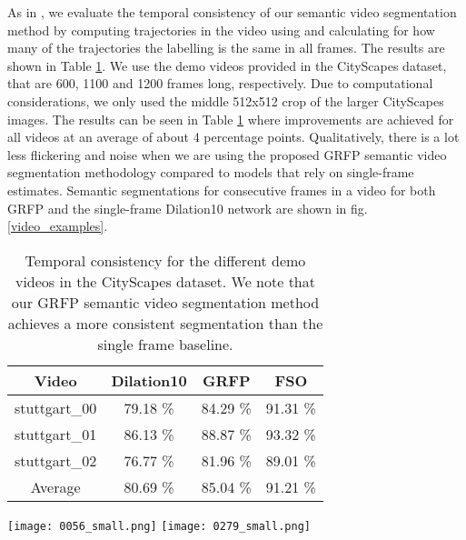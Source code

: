 \documentclass[10pt,twocolumn,letterpaper]{article}
\begin{document}
As in \cite{kundu2016feature}, we evaluate the temporal consistency of our semantic video segmentation method by computing trajectories in the video using \cite{sundaram2010dense} and calculating for how many of the trajectories the labelling is the same in all frames. The results are shown in Table \ref{tab:temporal_results}. We use the demo videos provided in the CityScapes dataset, that are 600, 1100 and 1200 frames long, respectively. Due to computational considerations, we only used the middle 512x512 crop of the larger CityScapes images. The results can be seen in Table \ref{tab:temporal_results} where improvements are achieved for all videos at an average of about 4 percentage points. Qualitatively, there is a lot less flickering and noise when we are using the proposed GRFP semantic video segmentation methodology compared to models that rely on single-frame estimates. Semantic segmentations for consecutive frames in a video for both GRFP and the single-frame Dilation10 network are shown in fig. \ref{video_examples}.

\begin{table}[!htbp]
    \centering
    \begin{tabular}{|c||c|c|c|} \hline
        Video & Dilation10 & GRFP & FSO \cite{kundu2016feature} \\ \hline\hline
        stuttgart\_00 & 79.18 \% & 84.29 \% & 91.31 \% \\ 
        stuttgart\_01 & 86.13 \% & 88.87 \% & 93.32 \%  \\ 
        stuttgart\_02 & 76.77 \% & 81.96 \% & 89.01 \%  \\ \hline
        Average & 80.69 \% & 85.04 \% & 91.21 \% \\ \hline
    \end{tabular} \caption{Temporal consistency for the different demo videos in the CityScapes dataset. We note that our GRFP semantic video segmentation method achieves a more consistent segmentation than the single frame baseline.}
    \label{tab:temporal_results}
\end{table}

\begin{figure*}[!htbp]
\texttt{[image: 0056\_small.png]}
\texttt{[image: 0279\_small.png]}
    \caption{Examples of semantic segmentations in consecutive video frames from CityScapes. From top to bottom we have the frames, the static segmentation by Dilation10 and the video segmentation by GRFP. In the first example we have a more consistent estimation of vegetation over time and in the second example we see that the GRFP suppresses some spurious objects in the middle of the image that appear in a few of the frames for the Dilation network.}
    \label{video_examples}
\end{figure*}
\end{document}
